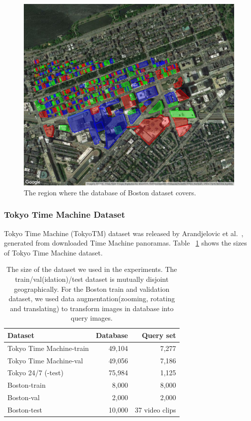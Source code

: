 \begin{figure}
\includegraphics[width=0.92\linewidth]{img/db_region}
\caption{The region where the database of Boston dataset covers. }
\label{fig:dbregion}
\end{figure}

\subsubsection{Tokyo Time Machine Dataset}
\par

Tokyo Time Machine (TokyoTM) dataset was released by Arandjelovic et al.~\cite{Arandjelovic16}, generated  from  downloaded  Time  Machine  panoramas. Table ~\ref{table:netvlad} shows  the  sizes  of  Tokyo Time Machine dataset. 

\begin{table}
\begin{tabular}{l|rr}
Dataset & Database & Query set \\
\hline
\hline
Tokyo Time Machine-train & 49,104 & 7,277 \\
Tokyo Time Machine-val & 49,056 & 7,186 \\
Tokyo 24/7 (-test) & 75,984 & 1,125\\
\hline
Boston-train & 8,000 & 8,000 \\
Boston-val & 2,000 & 2,000 \\
Boston-test & 10,000 & 37 video clips
\end{tabular}
\caption{The size of the dataset we used in the experiments. The train/val(idation)/test dataset is mutually disjoint geographically. For the Boston train and validation dataset, we used data augmentation(zooming, rotating and translating) to transform images in database into query images. }
\label{table:netvlad}
\end{table}



